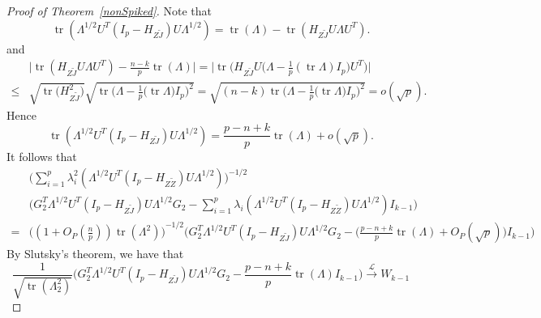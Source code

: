 \documentclass[review]{elsarticle}
\DeclareMathOperator{\mytr}{tr}
\theoremstyle{plain}
\theoremstyle{definition}
\theoremstyle{remark}
\begin{document}
\begin{proof}[\textrm{Proof of Theorem~\ref{nonSpiked}}]
Note that
    $$
    \mytr(\Lambda^{1/2}U^T (I_p-H_{Z\tilde{J}})U\Lambda^{1/2})
    =
    \mytr(\Lambda)-\mytr(H_{Z\tilde{J}}U\Lambda U^T).
    $$ 
and
    $$
    \begin{aligned}
        &
        \big|
    \mytr(H_{Z\tilde{J}}U\Lambda U^T)
    -\frac{n-k}{p}\mytr(\Lambda)
    \big|
    =
    \big|
    \mytr\Big(H_{Z\tilde{J}} U \big(\Lambda-\frac{1}{p} (\mytr \Lambda) I_p \big) U^T\Big)
    \big|
        \\
        \leq &
        \sqrt{\mytr \big(H_{Z\tilde{J}}^2\big)}
        \sqrt{\mytr \Big(\Lambda-\frac{1}{p}\big(\mytr \Lambda\big) I_p\Big)^2}
        =\sqrt{(n-k)\mytr \Big(\Lambda-\frac{1}{p}\big(\mytr \Lambda\big) I_p\Big)^2}
        =o(\sqrt{p}).
    \end{aligned}
    $$
    Hence 
    $$
    \mytr(\Lambda^{1/2}U^T (I_p-H_{Z\tilde{J}})U\Lambda^{1/2})
    =
    \frac{p-n+k}{p}\mytr(\Lambda)+o(\sqrt{p}).
    $$
    It follows that
    $$
    \begin{aligned}
        &\Big(\sum_{i=1}^p \lambda_i^2(\Lambda^{1/2}U^T(I_p-H_{Z\tilde{Z}})U\Lambda^{1/2})\Big)^{-1/2}\\
        &{\Big( G_2^T \Lambda^{1/2}U^T (I_p-H_{Z\tilde{J}})U\Lambda^{1/2}G_2-\sum_{i=1}^p \lambda_i(\Lambda^{1/2}U^T(I_p-H_{Z\tilde{Z}})U\Lambda^{1/2})I_{k-1}\Big)}\\
        =&
        {\Big( (1+O_P(\frac{n}{p}))\mytr (\Lambda^2)\Big) }^{-1/2} {\Big( G_2^T \Lambda^{1/2}U^T (I_p-H_{Z\tilde{J}})U\Lambda^{1/2}G_2-
        \big(\frac{p-n+k}{p}\mytr(\Lambda)+O_P(\sqrt{p})\big)I_{k-1}
        \Big)}
    \end{aligned}
    $$
    By Slutsky's theorem, we have that
    $$
    \frac{1}{\sqrt{\mytr(\Lambda_2^2)}}
    {\Big( G_2^T \Lambda^{1/2}U^T (I_p-H_{Z\tilde{J}})U\Lambda^{1/2}G_2-
        \frac{p-n+k}{p}\mytr(\Lambda)I_{k-1}\Big)}
    \xrightarrow{\mathcal{L}}W_{k-1}
    $$


\end{proof}
\end{document}
